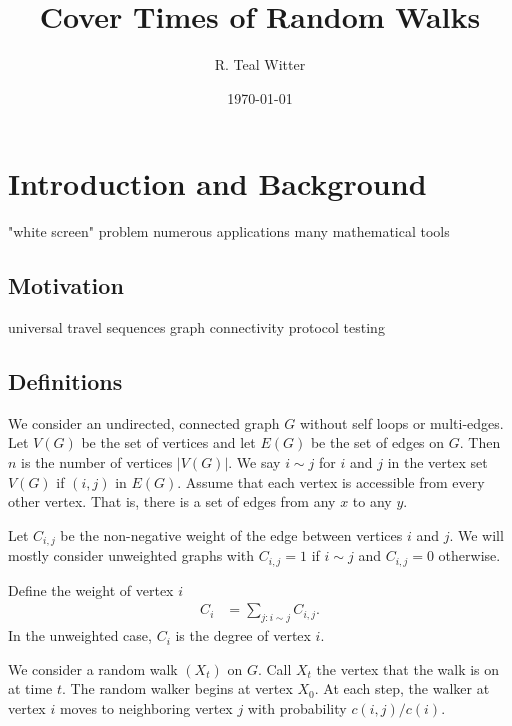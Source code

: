 \documentclass[12pt]{article}
\theoremstyle{definition}
\begin{document}
\title{Cover Times of Random Walks}


\author{R. Teal Witter}

\date{\today}



\maketitle


\newpage
\tableofcontents

\newpage
\section{Introduction and Background}

"white screen" problem
numerous applications
many mathematical tools

\subsection{Motivation}
universal travel sequences
graph connectivity
protocol testing

\subsection{Definitions}
We consider an undirected, connected graph $G$ without self loops or multi-edges.
Let $V(G)$ be the set of vertices and let $E(G)$ be the set of edges on $G$.
Then $n$ is the number of vertices $|V(G)|$.
We say $i\sim j$ for $i$ and $j$ in the vertex set $V(G)$ if $(i,j)$ in $E(G)$.
Assume that each vertex is accessible from every other vertex.
That is, there is a set of edges from any $x$ to any $y$.

Let $C_{i,j}$ be the non-negative weight of the edge between vertices $i$ and $j$.
We will mostly consider unweighted graphs
with $C_{i,j} = 1$ if $i \sim j$ and $C_{i,j} = 0$ otherwise.

Define the weight of vertex $i$ 
\begin{align}
C_i &= \sum_{j:i \sim j} C_{i,j}. \nonumber
\end{align}
In the unweighted case, $C_i$ is the degree of vertex $i$.

We consider a random walk $(X_t)$ on $G$.
Call $X_t$ the vertex that the walk is on at time $t$.
The random walker begins at vertex $X_0$.
At each step, the walker at vertex $i$ moves to neighboring vertex
$j$ with probability $c(i,j)/c(i)$.
\end{document}

